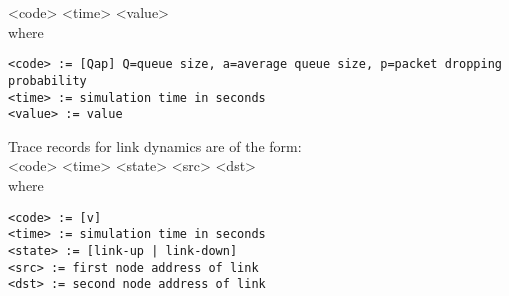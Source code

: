 \begin{flushleft}
<code> <time> <value> \\

where \\
\begin{verbatim}
<code> := [Qap] Q=queue size, a=average queue size, p=packet dropping
probability
<time> := simulation time in seconds 
<value> := value 
\end{verbatim}

Trace records for link dynamics are of the form: \\

<code> <time> <state> <src> <dst> \\

where \\
\begin{verbatim}
<code> := [v]
<time> := simulation time in seconds 
<state> := [link-up | link-down]
<src> := first node address of link 
<dst> := second node address of link 
\end{verbatim} 
\end{flushleft}


\endinput
